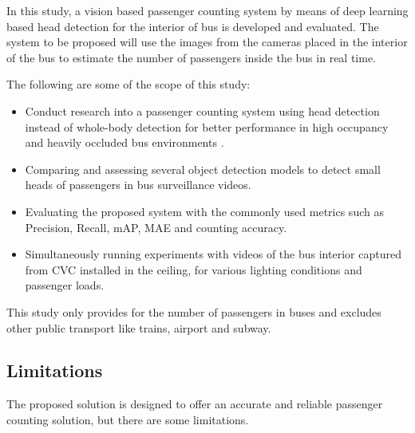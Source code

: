 In this study, a vision based passenger counting system by means of deep learning based head detection for the interior of bus is developed and evaluated. The system to be proposed will use the images from the cameras placed in the interior of the bus to estimate the number of passengers inside the bus in real time.

The following are some of the scope of this study:

\begin{itemize}[itemsep=0pt]

    \item Conduct research into a passenger counting system using head detection instead of whole-body detection for better performance in high occupancy and heavily occluded bus environments \cite{rpeeheads2024}.
    
    \item Comparing and assessing several object detection models to detect small heads of passengers in bus surveillance videos.
    
    \item Evaluating the proposed system with the commonly used metrics such as Precision, Recall, mAP, MAE and counting accuracy.
    
    \item Simultaneously running experiments with videos of the bus interior captured from CVC installed in the ceiling, for various lighting conditions and passenger loads.

\end{itemize}

This study only provides for the number of passengers in buses and excludes other public transport like trains, airport and subway.

\subsection{Limitations}

The proposed solution is designed to offer an accurate and reliable passenger counting solution, but there are some limitations.

